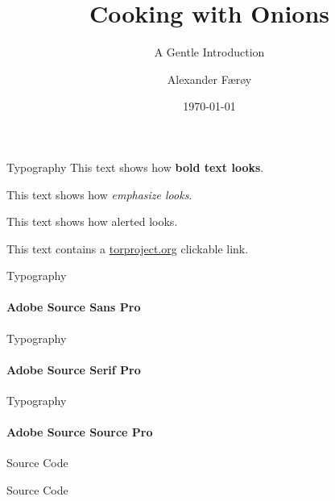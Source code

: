 \documentclass[aspectratio=169,10pt]{beamer}
\title{Cooking with Onions}
\subtitle{A Gentle Introduction}
\date{\today}
\author{Alexander Færøy}
\institute{The Royal Danish Onion Cooking Academy}
\begin{document}
\maketitle

\begin{frame}[fragile]{Typography}
    This text shows how \textbf{bold text looks}.

    This text shows how \emph{emphasize looks}.

    This text shows how \alert{alerted looks}.

    This text contains a \href{https://torproject.org/}{torproject.org} clickable link.
\end{frame}

\begin{frame}[fragile]{Typography}
    \framesubtitle{Adobe Source Sans Pro}

    {\sf\lipsum[1]}
\end{frame}

\begin{frame}[fragile]{Typography}
    \framesubtitle{Adobe Source Serif Pro}

    {\rm\lipsum[1]}
\end{frame}

\begin{frame}[fragile]{Typography}
    \framesubtitle{Adobe Source Source Pro}

    {\tt\lipsum[1]}
\end{frame}

\begin{frame}[fragile]{Source Code}
\end{frame}

\begin{frame}[fragile]{Source Code}
    \begin{columns}[t]
        \begin{column}{0.48\textwidth}
        \end{column}
        \begin{column}{0.48\textwidth}
        \end{column}
    \end{columns}
\end{frame}
\end{document}
